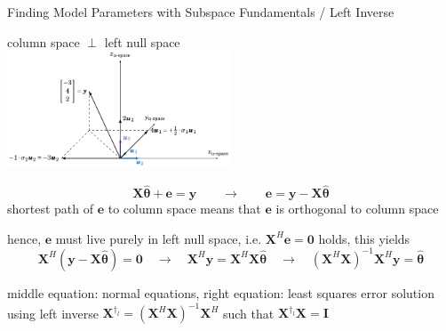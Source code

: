 \documentclass[mathserif, aspectratio=1610]{intbeamer}
\begin{document}
\begin{frame}[t]{Finding Model Parameters with Subspace Fundamentals / Left Inverse}
%
\begin{center}
\textcolor{C0}{column space} $\perp$ \textcolor{C4}{left null space}\\
\includegraphics[width=0.5\textwidth]{least_squares_error.pdf}
\end{center}
%
$$\bm{X} \hat{\bm{\theta}} + \bm{e} = \bm{y} \qquad \rightarrow \qquad \bm{e} = \bm{y} - \bm{X} \hat{\bm{\theta}}$$
%
shortest path of $\bm{e}$ to column space means that $\bm{e}$ is orthogonal to column space

hence, $\bm{e}$ must live purely in left null space, i.e. $\bm{X}^H \bm{e} = \bm{0}$ holds, this yields
%
$$\bm{X}^H (\bm{y} - \bm{X} \hat{\bm{\theta}}) = \bm{0} \quad \rightarrow \quad \bm{X}^H \bm{y} = \bm{X}^H \bm{X} \hat{\bm{\theta}} \quad \rightarrow \quad
(\bm{X}^H \bm{X})^{-1} \bm{X}^H \bm{y} = \hat{\bm{\theta}}
$$

middle equation: normal equations, right equation: least squares error solution using left inverse $\bm{X}^{\dagger_l} = (\bm{X}^H \bm{X})^{-1} \bm{X}^H$ such that
$\bm{X}^{\dagger_l} \bm{X} = \bm{I}$


\end{frame}
\end{document}
